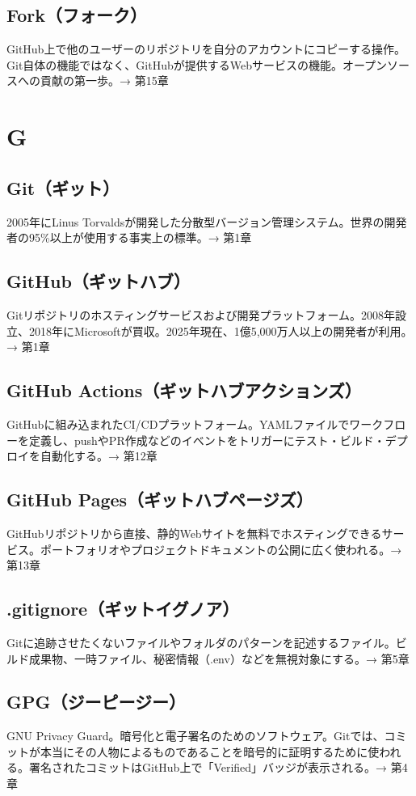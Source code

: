 \subsection*{Fork（フォーク）}
GitHub上で他のユーザーのリポジトリを自分のアカウントにコピーする操作。Git自体の機能ではなく、GitHubが提供するWebサービスの機能。オープンソースへの貢献の第一歩。→ 第15章

\section*{G}

\subsection*{Git（ギット）}
2005年にLinus Torvaldsが開発した分散型バージョン管理システム。世界の開発者の95\%以上が使用する事実上の標準。→ 第1章

\subsection*{GitHub（ギットハブ）}
Gitリポジトリのホスティングサービスおよび開発プラットフォーム。2008年設立、2018年にMicrosoftが買収。2025年現在、1億5,000万人以上の開発者が利用。→ 第1章

\subsection*{GitHub Actions（ギットハブアクションズ）}
GitHubに組み込まれたCI/CDプラットフォーム。YAMLファイルでワークフローを定義し、pushやPR作成などのイベントをトリガーにテスト・ビルド・デプロイを自動化する。→ 第12章

\subsection*{GitHub Pages（ギットハブページズ）}
GitHubリポジトリから直接、静的Webサイトを無料でホスティングできるサービス。ポートフォリオやプロジェクトドキュメントの公開に広く使われる。→ 第13章

\subsection*{.gitignore（ギットイグノア）}
Gitに追跡させたくないファイルやフォルダのパターンを記述するファイル。ビルド成果物、一時ファイル、秘密情報（.env）などを無視対象にする。→ 第5章

\subsection*{GPG（ジーピージー）}
GNU Privacy Guard。暗号化と電子署名のためのソフトウェア。Gitでは、コミットが本当にその人物によるものであることを暗号的に証明するために使われる。署名されたコミットはGitHub上で「Verified」バッジが表示される。→ 第4章

